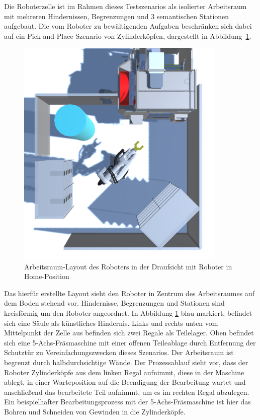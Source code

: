 Die Roboterzelle ist im Rahmen dieses Testszenarios als isolierter Arbeitsraum
mit mehreren Hindernissen, Begrenzungen und 3 semantischen Stationen aufgebaut.
Die vom Roboter zu bewältigenden Aufgaben beschränken sich dabei auf ein
Pick-and-Place-Szenario von Zylinderköpfen, dargestellt in
Abbildung~\ref{figure:arbeitsraum}.

\begin{figure}[H]
  \centering
  \includegraphics[width=10cm]{Figures/Roboterzelle.png}
  \caption{Arbeitsraum-Layout des Roboters in der Draufsicht mit Roboter in
  Home-Position}
  \label{figure:arbeitsraum}
\end{figure}

Das hierfür erstellte Layout sieht den Roboter in Zentrum des Arbeitsraumes auf
dem Boden stehend vor. Hindernisse, Begrenzungen und Stationen sind kreisförmig
um den Roboter angeordnet. In Abbildung
\ref{figure:arbeitsraum}
blau markiert, befindet sich eine Säule als künstliches Hindernis.
Links und rechts unten vom Mittelpunkt der Zelle aus befinden sich
zwei Regale als Teilelager. Oben befindet sich eine 5-Achs-Fräsmaschine mit
einer offenen Teileablage durch Entfernung der Schutztür zu
Vereinfachungszwecken dieses Szenarios. Der Arbeitsraum ist begrenzt durch
halbdurchsichtige Wände. Der Prozessablauf sieht vor, dass der Roboter
Zylinderköpfe aus dem linken Regal aufnimmt, diese in der Maschine ablegt, in
einer Warteposition auf die Beendigung der Bearbeitung wartet und anschließend
das bearbeitete Teil aufnimmt, um es im rechten Regal abzulegen. Ein
beispielhafter Bearbeitungsprozess mit der 5-Achs-Fräsmaschine ist
hier das Bohren und Schneiden von Gewinden
in die Zylinderköpfe.

